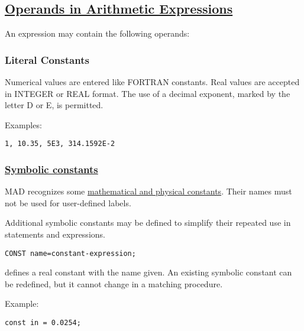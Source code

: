 \subsection{\href{operand}{Operands in Arithmetic Expressions}} 
\label{subsec:operand}
An expression may contain the following operands:  

\subsubsection{Literal Constants} 
Numerical values are entered like FORTRAN constants. Real values are
accepted in INTEGER or REAL format. The use of a decimal exponent,
marked by the letter D or E, is permitted.  

Examples: 
\begin{verbatim}
1, 10.35, 5E3, 314.1592E-2
\end{verbatim}

\subsubsection{\href{constant}{Symbolic constants}} 
\label{subsubsec:symbolic_const}
MAD recognizes some \hyperlink{constant}{mathematical and physical
  constants}. Their names must not be used for user-defined labels.  

Additional symbolic constants may be defined to simplify their repeated
use in statements and expressions.  

\begin{verbatim}
CONST name=constant-expression;
\end{verbatim} 
defines a real constant with the name given. An existing symbolic constant can be redefined, but it cannot change in a matching procedure. 

Example: 
\begin{verbatim}
const in = 0.0254;
\end{verbatim}

